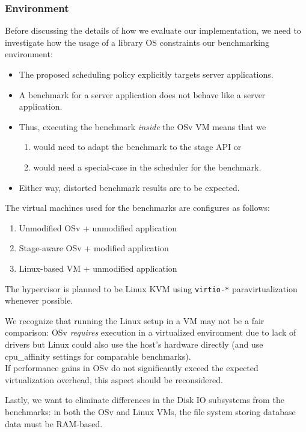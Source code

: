 \documentclass{article}
\begin{document}
\subsubsection{Environment}\label{environment}
Before discussing the details of how we evaluate our implementation,
we need to investigate how the usage of a library OS constraints our benchmarking environment:

\begin{itemize}
    \item The proposed scheduling policy explicitly targets server applications.
    \item A benchmark for a server application does not behave like a server application.
    \item Thus, executing the benchmark \emph{inside} the OSv VM means that we
    \begin{enumerate}
        \item would need to adapt the benchmark to the stage API or
        \item would need a special-case in the scheduler for the benchmark.
    \end{enumerate}
    \item Either way, distorted benchmark results are to be expected.
\end{itemize}

The virtual machines used for the benchmarks are configures as follows:
\begin{enumerate}
    \item Unmodified OSv + unmodified application
    \item Stage-aware OSv + modified application
    \item \label{linuxvmsetup} Linux-based VM + unmodified application
\end{enumerate}
The hypervisor is planned to be Linux KVM using \texttt{virtio-*} paravirtualization whenever possible.

We recognize that running the Linux setup in a VM may not be a fair comparison:
OSv \emph{requires} execution in a virtualized environment due to lack of drivers
but Linux could also use the host's hardware directly (and use cpu\_affinity settings for comparable benchmarks).\\
If performance gains in OSv do not significantly exceed the expected virtualization overhead, this aspect should be reconsidered.

Lastly, we want to eliminate differences in the Disk IO subsystems from the benchmarks:
in both the OSv and Linux VMs, the file system storing database data must be RAM-based.
\end{document}
